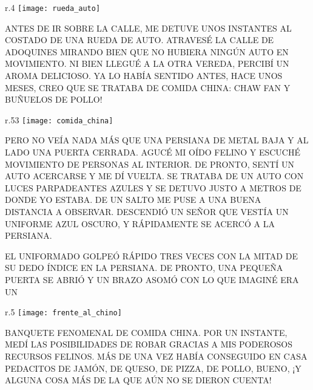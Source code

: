\newpage
{}
\begin{wrapfigure}{r}{.4\textwidth}
	\texttt{[image: rueda\_auto]}
\end{wrapfigure}
ANTES DE IR SOBRE LA CALLE, ME DETUVE UNOS INSTANTES AL COSTADO DE UNA RUEDA DE AUTO.
ATRAVESÉ LA CALLE DE ADOQUINES MIRANDO BIEN QUE NO HUBIERA NINGÚN AUTO EN MOVIMIENTO.  NI BIEN LLEGUÉ A LA OTRA VEREDA, PERCIBÍ UN AROMA DELICIOSO. YA LO HABÍA SENTIDO ANTES,	 HACE UNOS MESES, CREO QUE 
SE TRATABA DE COMIDA CHINA: CHAW FAN Y BUÑUELOS DE POLLO!

\newpage

\begin{wrapfigure}{r}{.53\textwidth}
	\texttt{[image: comida\_china]}
\end{wrapfigure}
PERO NO VEÍA NADA MÁS QUE UNA PERSIANA DE METAL BAJA Y AL LADO UNA PUERTA CERRADA. AGUCÉ MI OÍDO FELINO Y ESCUCHÉ MOVIMIENTO DE PERSONAS AL INTERIOR.  DE PRONTO, 
SENTÍ UN AUTO ACERCARSE Y ME DÍ VUELTA. SE TRATABA DE UN AUTO CON LUCES PARPADEANTES AZULES Y SE DETUVO
JUSTO A METROS DE DONDE YO ESTABA. DE UN SALTO ME PUSE A UNA BUENA DISTANCIA A OBSERVAR. 
DESCENDIÓ UN SEÑOR QUE VESTÍA UN UNIFORME AZUL OSCURO, Y RÁPIDAMENTE SE ACERCÓ A LA PERSIANA.


\newpage



EL UNIFORMADO GOLPEÓ RÁPIDO TRES VECES CON LA MITAD DE SU DEDO ÍNDICE  EN LA PERSIANA.
DE PRONTO, UNA PEQUEÑA PUERTA SE ABRIÓ Y UN BRAZO ASOMÓ CON	  LO QUE IMAGINÉ ERA UN
\begin{wrapfigure}{r}{.5\textwidth}
	\texttt{[image: frente\_al\_chino]}
\end{wrapfigure}     
BANQUETE FENOMENAL DE COMIDA CHINA. POR UN INSTANTE, MEDÍ LAS POSIBILIDADES DE ROBAR GRACIAS A MIS PODEROSOS RECURSOS FELINOS. MÁS DE UNA VEZ HABÍA CONSEGUIDO EN CASA PEDACITOS DE JAMÓN, DE QUESO, DE PIZZA, DE POLLO, BUENO, ¡Y ALGUNA COSA MÁS DE LA QUE AÚN NO SE DIERON CUENTA! 








